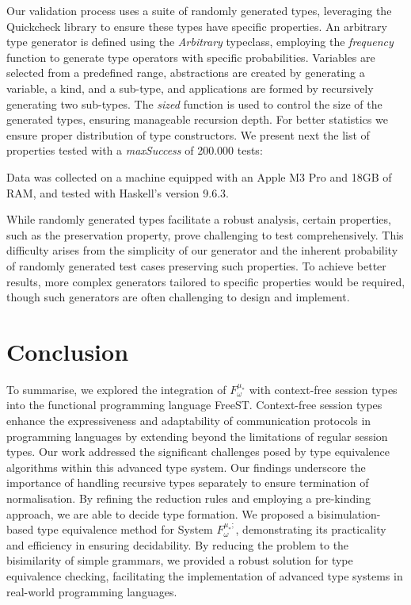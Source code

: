 \documentclass[runningheads,dvipsnames]{llncs}
\begin{document}
Our validation process uses a suite of randomly generated types, leveraging the Quickcheck library\cite{DBLP:conf/icfp/ClaessenH00} to ensure these types have specific properties. An arbitrary type generator is defined using the \textit{Arbitrary} typeclass, employing the \textit{frequency} function to generate type operators with specific probabilities. Variables are selected from a predefined range, abstractions are created by generating a variable, a kind, and a sub-type, and applications are formed by recursively generating two sub-types. The \textit{sized} function is used to control the size of the generated types, ensuring manageable recursion depth. For better statistics we ensure proper distribution of type constructors. We present next the list of properties tested with a \textit{maxSuccess} of 200.000 tests:



Data was collected on a machine equipped with an Apple M3 Pro and 18GB of RAM, and tested with Haskell's version 9.6.3.

While randomly generated types facilitate a robust analysis, certain properties, such as the preservation property, prove challenging to test comprehensively. This difficulty arises from the simplicity of our generator and the inherent probability of randomly generated test cases preserving such properties. To achieve better results, more complex generators tailored to specific properties would be required, though such generators are often challenging to design and implement. 

\section{Conclusion}
To summarise, we explored the integration of $F^{\mu_*}_\omega$ with context-free session types into the functional programming language FreeST. Context-free session types enhance the expressiveness and adaptability of communication protocols in programming languages by extending beyond the limitations of regular session types. Our work addressed the significant challenges posed by type equivalence algorithms within this advanced type system. Our findings underscore the importance of handling recursive types separately to ensure termination of normalisation. By refining the reduction rules and employing a pre-kinding approach, we are able to decide type formation.
We proposed a bisimulation-based type equivalence method for System $F^{\mu_*;}_\omega$, demonstrating its practicality and efficiency in ensuring decidability. By reducing the problem to the bisimilarity of simple grammars, we provided a robust solution for type equivalence checking, facilitating the implementation of advanced type systems in real-world programming languages.
\end{document}
